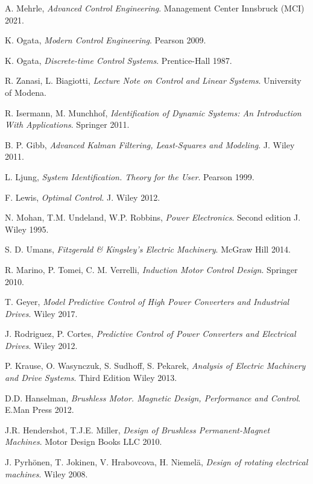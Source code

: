 \documentclass[11pt,a4paper,oneside]{book}
\numberwithin{equation}{section}
\theoremstyle{it}
\theoremstyle{definition}
\begin{document}
\clearpage
\begin{thebibliography}{99}
	A. Mehrle, \emph{Advanced Control Engineering}. Management Center Innsbruck (MCI) 2021.
	
	K. Ogata, \emph{Modern Control Engineering}. Pearson 2009.	
	
	K. Ogata, \emph{Discrete-time Control Systems}. Prentice-Hall 1987.
	
	R. Zanasi, L. Biagiotti, \emph{Lecture Note on Control and Linear Systems}. University of Modena.
	
	R. Isermann, M. Munchhof, \emph{Identification of Dynamic Systems: An Introduction With Applications}. Springer 2011.
	
	B. P. Gibb, \emph{Advanced Kalman Filtering, Least-Squares and Modeling}. J. Wiley 2011.

	L. Ljung,  \emph{System Identification. Theory for the User}. Pearson 1999.

	F. Lewis, \emph{Optimal Control}. J. Wiley 2012.

	N. Mohan, T.M. Undeland, W.P. Robbins, \emph{Power Electronics}. Second edition J. Wiley 1995.
	
	S. D. Umans, \emph{Fitzgerald \& Kingsley's Electric Machinery}. McGraw Hill 2014.

	R. Marino, P. Tomei, C. M. Verrelli, \emph{Induction Motor Control Design}.  Springer 2010.

	T. Geyer, \emph{Model Predictive Control of High Power Converters and Industrial Drives}. Wiley 2017.
	
	J. Rodriguez, P. Cortes, \emph{Predictive Control of Power Converters and Electrical Drives}. Wiley 2012.
	
	P. Krause, O. Wasynczuk, S. Sudhoff, S. Pekarek, \emph{Analysis of Electric Machinery and Drive Systems}. Third Edition Wiley 2013.
	
	D.D. Hanselman,  \emph{Brushless Motor. Magnetic Design, Performance and Control}. E.Man Press 2012.
	
	J.R. Hendershot, T.J.E. Miller, \emph{Design of Brushless Permanent-Magnet Machines}. Motor Design Books LLC 2010.
	
	J. Pyrhönen, T. Jokinen, V. Hrabovcova, H. Niemelä,  \emph{Design of rotating electrical machines}. Wiley 2008.
	

\end{thebibliography}
\end{document}
